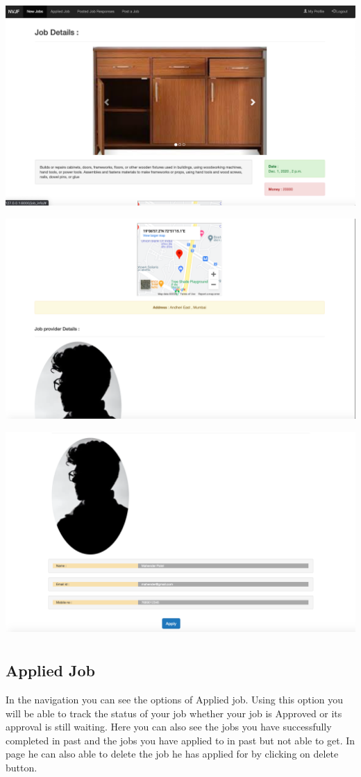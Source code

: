 \documentclass[a4paper 12pt]{article}
\begin{document}
\includegraphics[width=15cm, height=8cm]{Job details 1.png}
\includegraphics[width=15cm, height=8cm]{job details 2.png}
\includegraphics[width=15cm, height=8cm]{job details 3.png}

\subsection{Applied Job}
In the navigation you can see the options of Applied job. Using this option you will be able to track the status of your job whether your job is Approved or its approval is still waiting. Here you can also see the jobs you have successfully completed in past and the jobs you have applied to in past but not able to get. In page he can also able to delete the job he has applied for by clicking on delete button.\\
\end{document}
